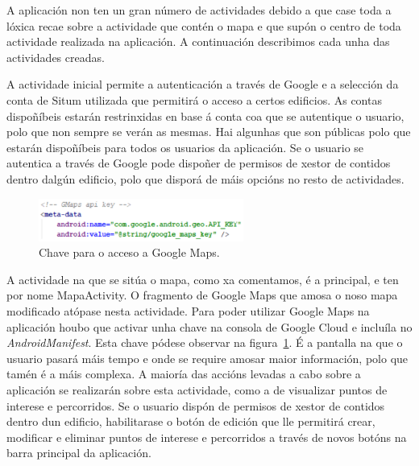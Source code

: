 A aplicación non ten un gran número de actividades debido a que case toda a lóxica recae sobre a actividade que contén o mapa e que supón o centro de toda actividade realizada na aplicación. A continuación describimos cada unha das actividades creadas.


A actividade inicial permite a autenticación a través de Google e a selección da conta de Situm utilizada que permitirá o acceso a certos edificios. As contas dispoñíbeis estarán restrinxidas en base á conta coa que se autentique o usuario, polo que non sempre se verán as mesmas. Hai algunhas que son públicas polo que estarán dispoñíbeis para todos os usuarios da aplicación. Se o usuario se autentica a través de Google pode dispoñer de permisos de xestor de contidos dentro dalgún edificio, polo que disporá de máis opcións no resto de actividades.

\begin{figure}[h]
	\begin{center}
		\includegraphics[width=0.6\textwidth]{figures/codigo/chaveGoogleMaps}
		\caption{Chave para o acceso a Google Maps.}
		\label{fig:chaveGoogleMaps}
	\end{center}
\end{figure}

A actividade na que se sitúa o mapa, como xa comentamos, é a principal, e ten por nome MapaActivity. O fragmento de Google Maps que amosa o noso mapa modificado atópase nesta actividade. Para poder utilizar Google Maps na aplicación houbo que activar unha chave na consola de Google Cloud e incluíla no \emph{AndroidManifest}. Esta chave pódese observar na figura~\ref{fig:chaveGoogleMaps}. É a pantalla na que o usuario pasará máis tempo e onde se require amosar maior información, polo que tamén é a máis complexa. A maioría das accións levadas a cabo sobre a aplicación se realizarán sobre esta actividade, como a de visualizar puntos de interese e percorridos. Se o usuario dispón de permisos de xestor de contidos dentro dun edificio, habilitarase o botón de edición que lle permitirá crear, modificar e eliminar puntos de interese e percorridos a través de novos botóns na barra principal da aplicación.

